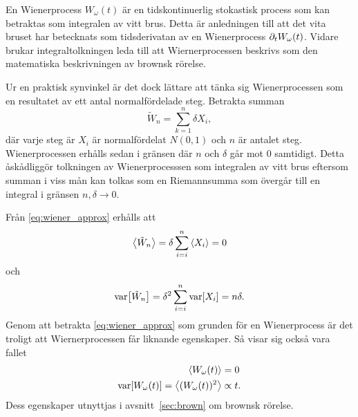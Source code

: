 En Wienerprocess $W_\omega(t)$ är en tidskontinuerlig stokastisk process som kan betraktas som integralen av vitt brus\cite{Miller_probability2012}. Detta är anledningen till att det vita bruset har betecknats som tidsderivatan av en Wienerprocess $\partial_tW_\omega(t)$. Vidare brukar integraltolkningen leda till att Wiernerprocessen beskrivs som den matematiska beskrivningen av brownsk rörelse. 

Ur en praktisk synvinkel är det dock lättare att tänka sig Wienerprocessen som en resultatet av ett antal normalfördelade steg. Betrakta summan
\begin{equation}\label{eq:wiener_approx}
\tilde{W}_n = \sum_{k=1}^{n} \delta X_i,
\end{equation}
där varje steg är $X_i$ är normalfördelat $N(0,1)$ och $n$ är antalet steg. 
Wienerprocessen erhålls sedan i gränsen där $n$ och $\delta$ går mot $0$ samtidigt\cite{Miller_probability2012}. Detta åskådliggör tolkningen av Wienerprocesssen som integralen av vitt brus eftersom summan i viss mån kan tolkas som en Riemannsumma som övergår till en integral i gränsen $n, \delta \to 0$.

Från \eqref{eq:wiener_approx} erhålls att 
\begin{equation}
\ev{\tilde{W}_n} = \delta \sum_{i=i}^n \ev{X_i} = 0
\end{equation}
och
\begin{equation}
\text{var}\!\left[\tilde{W}_n\right] = \delta^2 \sum_{i=i}^n \text{var}\!\left[X_i\right] = n\delta.
\end{equation}
Genom att betrakta \eqref{eq:wiener_approx} som grunden för en Wienerprocess är det troligt att Wiernerprocessen får liknande egenskaper. Så visar sig också vara fallet~\cite{Miller_probability2012}
\begin{equation}
\begin{aligned}
\ev{W_\omega(t)} &= 0\\
\VAR{ W_\omega(t) } = \ev{ (W_\omega(t))^2 } &\propto t.
\end{aligned}
\end{equation}
Dess egenskaper utnyttjas i avsnitt~\ref{sec:brown} om brownsk rörelse.





